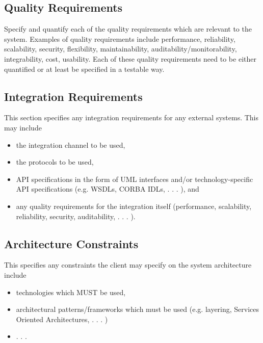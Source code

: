 \documentclass[a4paper,12pt]{article}
\begin{document}
\subsection{Quality Requirements}

Specify and quantify each of the quality requirements which are relevant to the system. Examples of quality requirements include performance, reliability, scalability, security, 
flexibility,
maintainability, auditability/monitorability, integrability, cost, usability. Each of these quality
requirements need to be either quantified or at least be specified in a testable way.

\subsection{Integration Requirements}

This section specifies any integration requirements for any external systems. This may include
\begin{itemize}
\item the integration channel to be used,
\item the protocols to be used,
\item API specifications in the form of UML interfaces and/or technology-specific API specifications (e.g. WSDLs, CORBA IDLs, . . . ), and
\item any quality requirements for the integration itself (performance, scalability, reliability, security, auditability, . . . ).
\end{itemize}

\subsection{Architecture Constraints}

This specifies any constraints the client may specify on the system architecture include
\begin{itemize}
\item technologies which MUST be used,
\item architectural patterns/frameworks which must be used (e.g. layering, Services Oriented Architectures, . . . )
\item . . .
\end{itemize}
\end{document}
